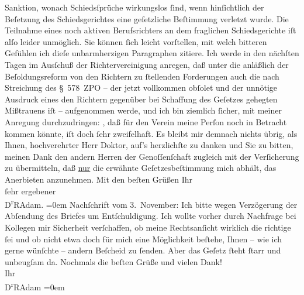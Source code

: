 \begin{ledgroupsized}[t]{13cm}
               Sanktion, wonach Schiedsſprüche wirkungs{\pb}los ſind, wenn hinſichtlich der Beſetzung des Schiedsgerichtes eine geſetzliche
               Beſtimmung verletzt wurde. Die Teilnahme eines noch aktiven Berufsrichters an dem
               fraglichen Schiedsgerichte iſt alſo leider unmöglich.\pend
           \pstart
           Sie können ſich leicht vorſtellen, mit welch bitteren Gefühlen ich dieſe
               unbarmherzigen Paragraphen zitiere.\pend
           \pstart
           Ich werde in den nächſten Tagen im Ausſchuß der Richtervereinigung anregen, daß unter die anläßlich der Beſoldungsreform von
               den Richtern zu ſtellenden Forderungen auch die nach Streichung des § 578 ZPO – der
               jetzt vollkommen obſolet und der unnötige Ausdruck eines den Richtern gegenüber bei
               Schaffung des Geſetzes gehegten Mißtrauens iſt – aufgenommen werde, und ich bin
               ziemlich ſicher, mit meiner Anregung durchzudringen: \label{K_L02357-1v}\label{K_L02357-1h}, daß für den Verein meine Perſon noch in Betracht kommen
               könnte, iſt doch ſehr zweifelhaft.\pend
           \pstart
           {\pb}Es bleibt mir demnach nichts übrig, als
               Ihnen, hochverehrter Herr Doktor, auf’s herzlichſte zu danken und Sie zu bitten,
               meinen Dank den andern Herren der Genoſſenſchaft zugleich mit der Verſicherung zu übermitteln, daß \uline{nur} die erwähnte Geſetzesbeſtimmung mich abhält, das
               Anerbieten anzunehmen.\pend
           \pstart
           Mit den beſten Grüßen Ihr{\\[\baselineskip]}ſehr ergebener{\\[\baselineskip]}\spacefill\mbox{D\textsuperscript{r}RAdam.}\pend
           \leftskip=0em{}\pstart
           \noindent{}Nachſchrift vom 3. November:\pend
           \pstart
           Ich bitte wegen Verzögerung der Abſendung des Briefes um Entſchuldigung. Ich wollte
               vorher durch Nachfrage bei Kollegen mir Sicherheit verſchaffen, ob meine
               Rechtsanſicht wirklich die richtige ſei und ob nicht etwa doch für mich eine
               Möglichkeit beſtehe, Ihnen – wie ich gerne wünſchte – andern Beſcheid zu ſenden. Aber
                  {\pb}das Geſetz ſteht ſtarr und unbeugſam
               da.\pend
           \pstart
           Nochmals die beſten Grüße und vielen Dank!{\\[\baselineskip]}Ihr{\\[\baselineskip]}\spacefill\mbox{D\textsuperscript{r}RAdam}\pend
           \leftskip=0em{}
         

\end{ledgroupsized}
